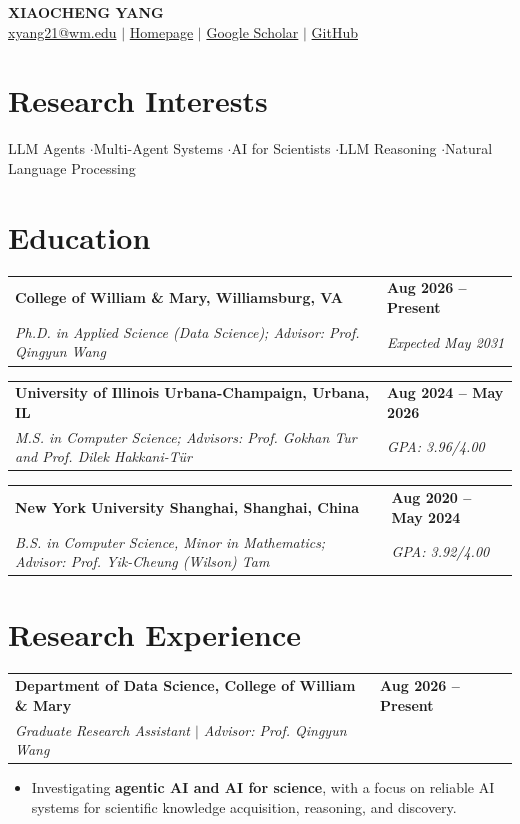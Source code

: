 \documentclass[letterpaper]{article}
\makeatletter
\newcommand{\entry}[4]{%
  \begin{tabularx}{\textwidth}{@{}>{\RaggedRight\arraybackslash}X>{\RaggedLeft\arraybackslash}p{1.55in}@{}}
    \textbf{#1} & \textbf{#2} \\
    \textit{#3} & \textit{#4}
  \end{tabularx}\vspace{1.5pt}
}
\newcommand{\researchentry}[4]{%
  \begin{tabularx}{\textwidth}{@{}>{\RaggedRight\arraybackslash}X>{\RaggedLeft\arraybackslash}p{1.55in}@{}}
    \textbf{#1} & \textbf{#2} \\
    \textit{#3} & \textit{#4}
  \end{tabularx}\vspace{-0.5pt}
}
\makeatother
\begin{document}
\fontsize{9}{10.7}\selectfont

\begin{center}
  {\fontsize{20}{22}\selectfont\bfseries\color{accent} XIAOCHENG YANG}\\[-1pt]
  {\fontsize{8.8}{10.5}\selectfont
  \href{mailto:xyang21@wm.edu}{xyang21@wm.edu}
  \enspace$\vert$\enspace
  \href{https://yxc-cyber.github.io/}{Homepage}
  \enspace$\vert$\enspace
  \href{https://scholar.google.com/citations?user=hTt0y8kAAAAJ}{Google Scholar}
  \enspace$\vert$\enspace
  \href{https://github.com/yxc-cyber}{GitHub}}
\end{center}
\vspace{-8pt}

\section{Research Interests}
LLM Agents \enspace$\cdot$\enspace Multi-Agent Systems \enspace$\cdot$\enspace AI for Scientists \enspace$\cdot$\enspace LLM Reasoning \enspace$\cdot$\enspace Natural Language Processing

\section{Education}
\entry{College of William \& Mary, Williamsburg, VA}{Aug 2026 -- Present}
      {Ph.D. in Applied Science (Data Science); Advisor: Prof. Qingyun Wang}{Expected May 2031}
\entry{University of Illinois Urbana-Champaign, Urbana, IL}{Aug 2024 -- May 2026}
      {M.S. in Computer Science; Advisors: Prof. Gokhan Tur and Prof. Dilek Hakkani-Tür}{GPA: 3.96/4.00}
\entry{New York University Shanghai, Shanghai, China}{Aug 2020 -- May 2024}
      {B.S. in Computer Science, Minor in Mathematics; Advisor: Prof. Yik-Cheung (Wilson) Tam}{GPA: 3.92/4.00}

\section{Research Experience}
\researchentry{Department of Data Science, College of William \& Mary}{Aug 2026 -- Present}
              {Graduate Research Assistant $\vert$ Advisor: Prof. Qingyun Wang}{}
\begin{itemize}
  \item Investigating \textbf{agentic AI and AI for science}, with a focus on reliable AI systems for scientific knowledge acquisition, reasoning, and discovery.
\end{itemize}
\end{document}
